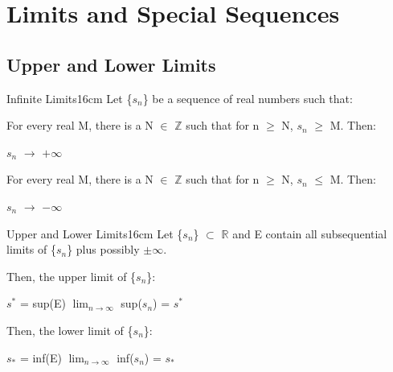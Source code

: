 \newpage

\section[Day 9: Limits \& Special Sequences]{ Limits and Special Sequences }

\subsection{ Upper and Lower Limits } 

	\begin{definition}{Infinite Limits}{16cm}
		Let \{$s_n$\} be a sequence of real numbers such that:

		\hspace{0.5cm}
		For every real M, there is a N $\in$ $\mathbb{Z}$ such that
		for n $\geq$ N, $s_n$ $\geq$ M. Then:

		\hspace{1cm}
		$s_n$ $\rightarrow$ $+\infty$

		\hspace{0.5cm}
		For every real M, there is a N $\in$ $\mathbb{Z}$ such that
		for n $\geq$ N, $s_n$ $\leq$ M. Then:

		\hspace{1cm}
		$s_n$ $\rightarrow$ $-\infty$		
	\end{definition}
	
	\vspace{0.5cm}



	\begin{definition}{Upper and Lower Limits}{16cm}
		Let \{$s_n$\} $\subset$ $\mathbb{R}$
		and E contain all subsequential limits of \{$s_n$\}
		plus possibly $\pm$$\infty$.

		Then, the {\color{lblue} upper limit} of \{$s_n$\}:

		\hspace{1cm}
		$s^*$ = sup(E) 
		\hspace{1cm} 
		$\lim_{n \rightarrow \infty}$ sup($s_n$) = $s^*$

		Then, the {\color{lblue} lower limit} of \{$s_n$\}:

		\hspace{1cm}
		$s_*$ = inf(E) 
		\hspace{1.2cm} 
		$\lim_{n \rightarrow \infty}$ inf($s_n$) = $s_*$
	\end{definition}
	


